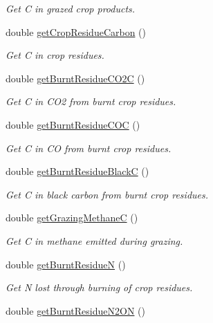 \begin{DoxyCompactItemize}
\begin{DoxyCompactList}\small\item\em Get C in grazed crop products. \end{DoxyCompactList}\item 
double \mbox{\hyperlink{class_crop_sequence_class_aa75f44fa8e749c2f59010972c2956dc7}{get\+Crop\+Residue\+Carbon}} ()
\begin{DoxyCompactList}\small\item\em Get C in crop residues. \end{DoxyCompactList}\item 
double \mbox{\hyperlink{class_crop_sequence_class_a848837241cb4bfeab78ddd81becca5e2}{get\+Burnt\+Residue\+C\+O2C}} ()
\begin{DoxyCompactList}\small\item\em Get C in C\+O2 from burnt crop residues. \end{DoxyCompactList}\item 
double \mbox{\hyperlink{class_crop_sequence_class_abd6622d0f4e91774943475f725877b0b}{get\+Burnt\+Residue\+C\+OC}} ()
\begin{DoxyCompactList}\small\item\em Get C in CO from burnt crop residues. \end{DoxyCompactList}\item 
double \mbox{\hyperlink{class_crop_sequence_class_ab6555a4ed0e9a6b4527e90938d10c61f}{get\+Burnt\+Residue\+BlackC}} ()
\begin{DoxyCompactList}\small\item\em Get C in black carbon from burnt crop residues. \end{DoxyCompactList}\item 
double \mbox{\hyperlink{class_crop_sequence_class_ab4dd8d2bb35bc75f0f7e3d916251553f}{get\+Grazing\+MethaneC}} ()
\begin{DoxyCompactList}\small\item\em Get C in methane emitted during grazing. \end{DoxyCompactList}\item 
double \mbox{\hyperlink{class_crop_sequence_class_a2c887c3ec30b6911a3444db4d9b116e2}{get\+Burnt\+ResidueN}} ()
\begin{DoxyCompactList}\small\item\em Get N lost through burning of crop residues. \end{DoxyCompactList}\item 
double \mbox{\hyperlink{class_crop_sequence_class_ad20b3689a946352cf147d57e2c22d069}{get\+Burnt\+Residue\+N2\+ON}} ()

\end{DoxyCompactItemize}

